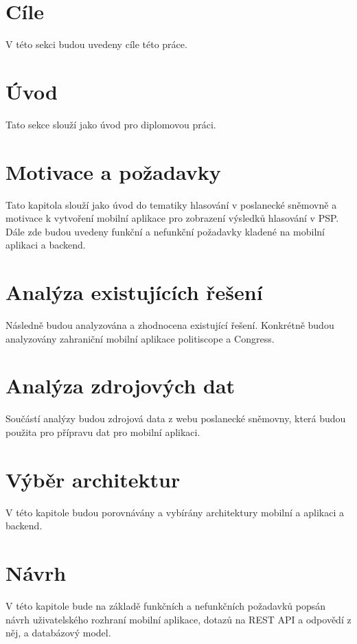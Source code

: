 \documentclass[czech,master,unicode]{ctufit-thesis}
\theoremstyle{plain}
\theoremstyle{definition}
\theoremstyle{remark}
\numberwithin{theorem}{chapter}
\begin{document}
\begin{summarypage}
	
\section*{Cíle}
V této sekci budou uvedeny cíle této práce.

\section*{Úvod}
Tato sekce slouží jako úvod pro diplomovou práci.

\section*{Motivace a požadavky}
Tato kapitola slouží jako úvod do tematiky hlasování v poslanecké sněmovně a motivace k vytvoření mobilní aplikace pro zobrazení výsledků hlasování v PSP. Dále zde budou uvedeny funkční \linebreak a nefunkční požadavky kladené na mobilní aplikaci a backend.

\section*{Analýza existujících řešení}
Následně budou analyzována a zhodnocena existující řešení. Konkrétně budou analyzovány zahraniční mobilní aplikace politiscope a Congress.

\section*{Analýza zdrojových dat}
Součástí analýzy budou zdrojová data z webu poslanecké sněmovny, která budou použita pro přípravu dat pro mobilní aplikaci.

\section*{Výběr architektur}
V této kapitole budou porovnávány a vybírány architektury mobilní a aplikaci a backend.

\section*{Návrh}
V této kapitole bude na základě funkčních a nefunkčních požadavků popsán návrh uživatelského rozhraní mobilní aplikace, dotazů na REST API a odpovědí z něj, a databázový model.


\end{summarypage}
\end{document}
